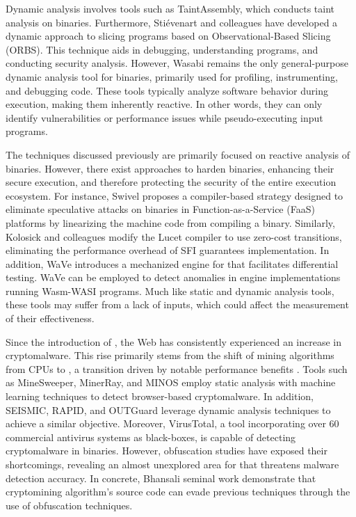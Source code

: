  Dynamic analysis involves tools such as TaintAssembly\cite{taintassembly}, which conducts taint analysis on \Wasm binaries. 
Furthermore, Stiévenart and colleagues have developed a dynamic approach to slicing \Wasm programs based on Observational-Based Slicing (ORBS)\cite{slicing, slicing2}.
This technique aids in debugging, understanding programs, and conducting security analysis.
However, Wasabi\cite{wasabi} remains the only general-purpose dynamic analysis tool for \Wasm binaries, primarily used for profiling, instrumenting, and debugging \Wasm code. 
These tools typically analyze software behavior during execution, making them inherently reactive. 
In other words, they can only identify vulnerabilities or performance issues while pseudo-executing input \Wasm programs.

The techniques discussed previously are primarily focused on reactive analysis of \Wasm binaries.
However, there exist approaches to harden \Wasm binaries, enhancing their secure execution, and therefore protecting the security of the entire execution ecosystem. 
For instance, Swivel\cite{Swivel} proposes a compiler-based strategy designed to eliminate speculative attacks on \Wasm binaries in Function-as-a-Service (FaaS) platforms by linearizing the machine code from compiling a \Wasm binary. 
Similarly, Kolosick and colleagues \cite{10.1145/3498688} modify the Lucet compiler to use zero-cost transitions, eliminating the performance overhead of SFI guarantees implementation.
In addition, WaVe\cite{wave} introduces a mechanized engine for \Wasm that facilitates differential testing. 
WaVe can be employed to detect anomalies in engine implementations running Wasm-WASI programs. 
Much like static and dynamic analysis tools, these tools may suffer from a lack of \Wasm inputs, which could affect the measurement of their effectiveness.



 Since the introduction of \Wasm, the Web has consistently experienced an increase in cryptomalware. 
This rise primarily stems from the shift of mining algorithms from CPUs to \Wasm, a transition driven by notable performance benefits \cite{musch2019new}.
Tools such as MineSweeper\cite{Minesweeper}, MinerRay\cite{MinerRay}, and MINOS\cite{MINOS} employ static analysis with machine learning techniques to detect browser-based cryptomalware.
In addition, SEISMIC\cite{SEISMIC}, RAPID\cite{RAPID}, and OUTGuard\cite{Outguard} leverage dynamic analysis techniques to achieve a similar objective.
Moreover, VirusTotal, a tool incorporating over 60 commercial antivirus systems as black-boxes, is capable of detecting cryptomalware in \Wasm binaries.
However, obfuscation studies have exposed their shortcomings, revealing an almost unexplored area for \Wasm that threatens malware detection accuracy.
In concrete, Bhansali \etal seminal work\cite{10.1145/3507657.3528560} demonstrate that cryptomining algorithm's source code can evade previous techniques through the use of obfuscation techniques.



